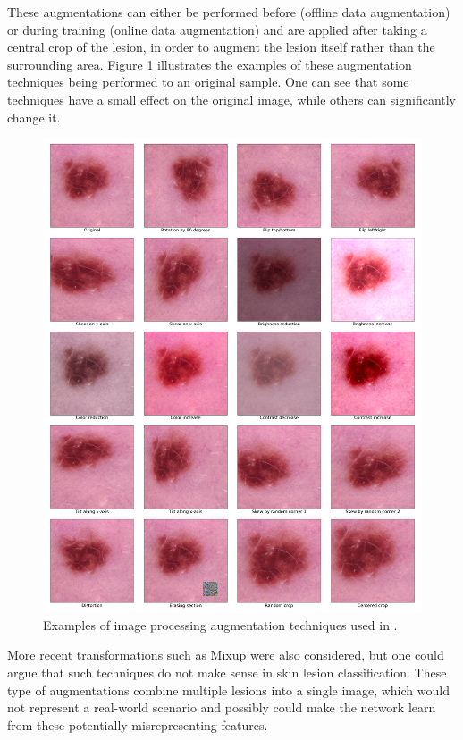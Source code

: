 
    These augmentations can either be performed before (offline data augmentation) or during training (online data augmentation) and are applied after taking a central crop of the lesion, in order to augment the lesion itself rather than the surrounding area. Figure \ref{fig:augmentations} illustrates the examples of these augmentation techniques being performed to an original sample. One can see that some techniques have a small effect on the original image, while others can significantly change it. \par
    \begin{figure}[ht]
        \centering
        \includegraphics[width=\textwidth]{figs/augmentations.pdf}
        \caption{Examples of image processing augmentation techniques used in .}
        \label{fig:augmentations}
    \end{figure}
    
    More recent transformations such as Mixup \cite{mixup} were also considered, but one could argue that such techniques do not make sense in skin lesion classification. These type of augmentations combine multiple lesions into a single image, which would not represent a real-world scenario and possibly could make the network learn from these potentially misrepresenting features. \par
    
